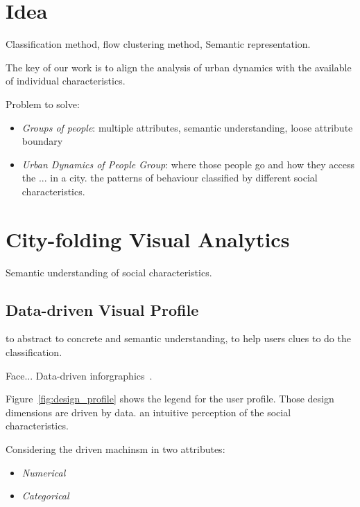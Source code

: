 \section{Idea}

Classification method, flow clustering method, Semantic representation. 

The key of our work is to align the analysis of urban dynamics with the available of individual characteristics. 

Problem to solve: 
\begin{itemize}
\item \textit{Groups of people}: multiple attributes, semantic understanding, loose attribute boundary
\item \textit{Urban Dynamics of People Group}: where those people go and how they access the ... in a city. the patterns of behaviour classified by different social characteristics.  
\end{itemize}

\section{City-folding Visual Analytics}

Semantic understanding of social characteristics.

\subsection{Data-driven Visual Profile}

to abstract to concrete and semantic understanding, to help users clues to do the classification. 

Face... Data-driven inforgraphics~\cite{}. 

Figure~\ref{fig:design_profile} shows the legend for the user profile. Those design dimensions are driven by data. an intuitive perception of the social characteristics. 

Considering the driven machinsm in two attributes: 
\begin{itemize}
\item \textit{Numerical}
\item \textit{Categorical}
\end{itemize}


